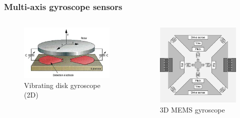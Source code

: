 \documentclass[10pt]{beamer}
\begin{document}
\begin{frame}
\frametitle{Multi-axis gyroscope sensors}
\begin{columns}
    \begin{column}{.58\textwidth}
        \begin{figure}
            \centering
            \includegraphics[width=1.0\linewidth]{vibrating_disk.png}
            \caption{Vibrating disk gyroscope (2D)\cite{Bosch}}
        \end{figure}
    \end{column}
    \hfill
    \begin{column}{.48\textwidth}
        \begin{figure}
            \centering
            \includegraphics[width=1.0\linewidth]{gyro_mems_3in1.png}
            \caption{3D MEMS gyroscope\cite{ST}}
        \end{figure}
    \end{column}
\end{columns}
\end{frame}
\end{document}
